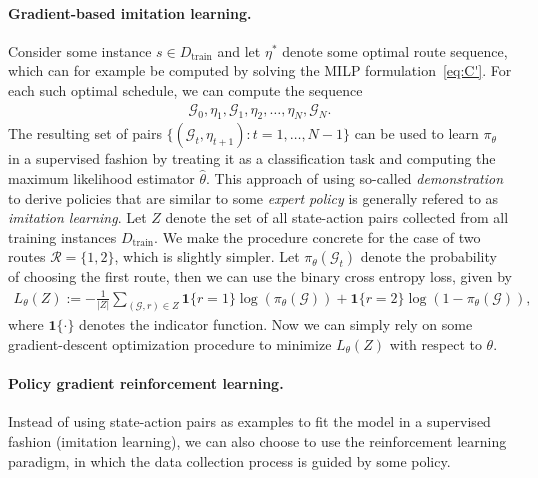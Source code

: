 \documentclass[a4paper]{report}
\theoremstyle{definition}
\theoremstyle{plain}
\begin{document}
\paragraph{Gradient-based imitation learning.}

Consider some instance $s \in D_\text{train}$ and let $\eta^{*}$ denote some optimal
route sequence, which can for example be computed by solving the MILP
formulation~\eqref{eq:C'}. For each such optimal schedule, we can compute the sequence
\begin{align*}
  \mathcal{G}_{0}, \eta_{1}, \mathcal{G}_{1}, \eta_{2}, \dots, \eta_{N}, \mathcal{G}_{N}.
\end{align*}
The resulting set of pairs $\{ (\mathcal{G}_{t}, \eta_{t+1}) : t = 1, \dots, N - 1 \}$
can be used to learn $\pi_{\theta}$ in a supervised fashion by treating it as a
classification task and computing the maximum likelihood estimator $\hat{\theta}$.
%
This approach of using so-called \textit{demonstration} to derive policies that are
similar to some \emph{expert policy} is generally refered to as
\textit{imitation learning}.
%
Let $Z$ denote the set of all state-action pairs collected from all
training instances $D_\text{train}$.
%
We make the procedure concrete for the case of two
routes $\mathcal{R} = \{ 1, 2 \}$, which is slightly simpler. Let $\pi_{\theta}(\mathcal{G}_{t})$
denote the probability of choosing the first route, then we can use the binary
cross entropy loss, given by
\begin{align}
  L_{\theta}(Z) := - \frac{1}{|Z|} \sum_{(\mathcal{G}, r) \in Z} \mathbf{1}\{r = 1\} \log(\pi_{\theta}(\mathcal{G})) + \mathbf{1}\{r = 2\} \log(1 - \pi_{\theta}(\mathcal{G})) ,
\end{align}
where $\mathbf{1}\{\cdot\}$ denotes the indicator function. Now we can simply rely on
some gradient-descent optimization procedure to minimize $L_{\theta}(Z)$ with
respect to $\theta$.

\paragraph{Policy gradient reinforcement learning.}

Instead of using state-action pairs as examples to fit the model in a supervised
fashion (imitation learning), we can also choose to use the reinforcement
learning paradigm, in which the data collection process is guided by some
policy.
\end{document}
